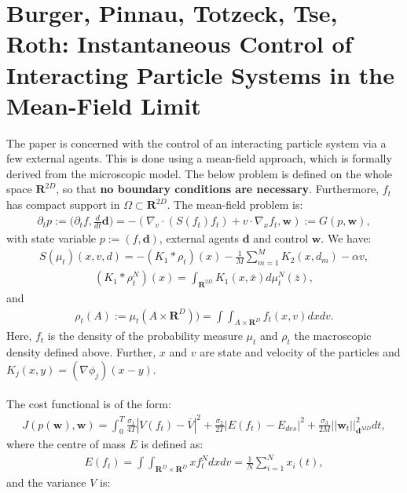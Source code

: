 \documentclass[11pt, a4paper]{article}
\theoremstyle{definition}
\begin{document}
\section{Burger, Pinnau, Totzeck, Tse, Roth: Instantaneous Control of Interacting Particle Systems in the Mean-Field Limit \cite{burger2019instantaneous}}
The paper is concerned with the control of an interacting particle system via a few external agents. This is done using a mean-field approach, which is formally derived from the microscopic model.
The below problem is defined on the whole space $\mathbf{R}^{2D}$, so that \textbf{no boundary conditions are necessary}. Furthermore, $f_t$ has compact support in $\Omega \subset \mathbf{R}^{2D}$.
The mean-field problem is:
\begin{align*}
\partial_t p:= \bigg(\partial_t f, \frac{d}{d t} \mathbf{d}\bigg) = - (\nabla_v \cdot (S(f_t)f_t) + v \cdot \nabla_x f_t, \mathbf{w}):= G(p,\mathbf{w}),
\end{align*}
with state variable $p:=(f, \mathbf{d})$, external agents $\mathbf{d}$ and control $\mathbf{w}$. We have: 
\begin{align*}
S(\mu_t)(x,v,d)= - (K_1 \ast \rho_t)(x) - \frac{1}{M}\sum_{m=1}^M K_2(x,d_m)-\alpha v,
\end{align*}
\begin{align*}
(K_1 \ast \rho_t^N)(x) = \int_{\mathbf{R}^{2D}} K_1(x, \bar{x}) d \mu_t^N(\bar{z}),
\end{align*}
and
\begin{align*}
\rho_t(A):= \mu_t(A \times \mathbf{R}^D)) = \int \int _{A \times \mathbf{R}^D}f_t(x,v)dx dv.
\end{align*}
Here, $f_t$ is the density of the probability measure $\mu_t$ and $\rho_t$ the macroscopic density defined above. Further, $x$ and $v$ are state and velocity of the particles and $K_j(x,y)= (\nabla \phi_j)(x-y)$.
\\
\\
The cost functional is of the form:
\begin{align*}
J(p(\mathbf{w}), \mathbf{w})= \int_0^T \frac{\sigma_1}{4T} | V(f_t)- \bar{V} |^2 + \frac{\sigma_2}{2T}| E(f_t) - E_{des}|^2 + \frac{\sigma_3}{2M} ||\mathbf{w}_t||^2_{\mathbf{d}^{MD}} dt,
\end{align*}
where the centre of mass $E$ is defined as:
\begin{align*}
E(f_t)= \int \int_{\mathbf{R}^D \times \mathbf{R}^D} x f_t^N dxdv = \frac{1}{N}\sum_{i=1}^N x_i(t),
\end{align*}
and the variance $V$ is:
\end{document}
